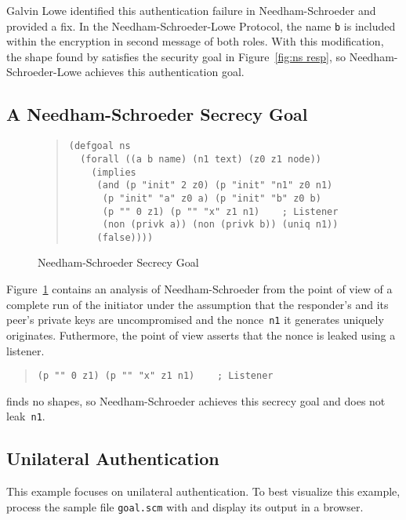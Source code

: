 \documentclass[12pt]{article}
\begin{document}
Galvin Lowe identified this authentication failure in
Needham-Schroeder and provided a fix.  In the Needham-Schroeder-Lowe
Protocol, the name \texttt{b} is included within the encryption in second
message of both roles.  With this modification, the shape found by
{\cpsa} satisfies the security goal in Figure~\ref{fig:ns resp}, so
Needham-Schroeder-Lowe achieves this authentication goal.

\subsection{A Needham-Schroeder Secrecy Goal}\label{sec:secrecy goal}

\begin{figure}
\begin{quote}
\begin{verbatim}
(defgoal ns
  (forall ((a b name) (n1 text) (z0 z1 node))
    (implies
     (and (p "init" 2 z0) (p "init" "n1" z0 n1)
      (p "init" "a" z0 a) (p "init" "b" z0 b)
      (p "" 0 z1) (p "" "x" z1 n1)    ; Listener
      (non (privk a)) (non (privk b)) (uniq n1))
     (false))))
\end{verbatim}
\end{quote}
\caption{Needham-Schroeder Secrecy Goal}\label{fig:ns secrecy}
\end{figure}

Figure~\ref{fig:ns secrecy} contains an analysis of Needham-Schroeder
from the point of view of a complete run of the initiator under the
assumption that the responder's and its peer's private keys are
uncompromised and the nonce~\texttt{n1} it generates uniquely
originates.  Futhermore, the point of view asserts that the nonce is
leaked using a listener.
\begin{quote}
\begin{verbatim}
(p "" 0 z1) (p "" "x" z1 n1)    ; Listener
\end{verbatim}
\end{quote}

{\cpsa} finds no shapes, so Needham-Schroeder achieves this secrecy
goal and does not leak~\texttt{n1}.

\subsection{Unilateral Authentication}\label{sec:unilateral}

This example focuses on unilateral authentication.  To best visualize
this example, process the sample file \texttt{goal.scm} with {\cpsa}
and display its output in a browser.
\end{document}
